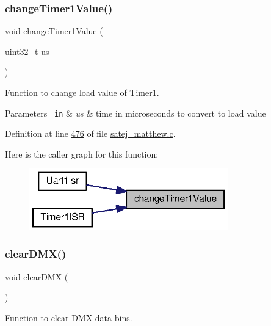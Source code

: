 \subsubsection{\texorpdfstring{changeTimer1Value()}{changeTimer1Value()}}
{\footnotesize\ttfamily void change\+Timer1\+Value (\begin{DoxyParamCaption}\item[{uint32\+\_\+t}]{us }\end{DoxyParamCaption})}



Function to change load value of Timer1. 


\begin{DoxyParams}[1]{Parameters}
\mbox{\texttt{ in}}  & {\em us} & time in microseconds to convert to load value \\
\hline
\end{DoxyParams}


Definition at line \mbox{\hyperlink{satej__matthew_8c_source_l00476}{476}} of file \mbox{\hyperlink{satej__matthew_8c_source}{satej\+\_\+matthew.\+c}}.

Here is the caller graph for this function\+:
\nopagebreak
\begin{figure}[H]
\begin{center}
\leavevmode
\includegraphics[width=244pt]{satej__matthew_8c_ae0e2b59e29ecdbadeb6bfa1a9efa5a85_icgraph}
\end{center}
\end{figure}
\mbox{\label{satej__matthew_8c_a90f05ed3280bc7f2e971ed7216028960}} 
\subsubsection{\texorpdfstring{clearDMX()}{clearDMX()}}
{\footnotesize\ttfamily void clear\+D\+MX (\begin{DoxyParamCaption}{ }\end{DoxyParamCaption})}



Function to clear D\+MX data bins. 



